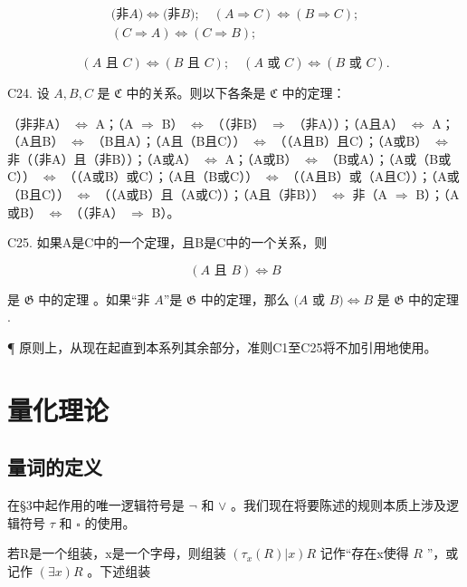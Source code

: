 \[
\begin{array}{c} \text {(非} A) \iff \text {(非} B); \quad (A \Rightarrow C) \iff (B \Rightarrow C); \\ (C \Rightarrow A) \iff (C \Rightarrow B); \end{array}
\]

\[
(A \text {   且   } C) \Longleftrightarrow (B \text {   且   } C); \quad (A \text {   或   } C) \Longleftrightarrow (B \text {   或   } C).
\]

C24. 设 \(A, B, C\) 是 \(\mathfrak{C}\) 中的关系。则以下各条是 \(\mathfrak{C}\) 中的定理：

（非非A） \(\Longleftrightarrow\) A；（A \(\Longrightarrow\) B） \(\Longleftrightarrow\) （（非B） \(\Longrightarrow\) （非A））；（A且A） \(\Longleftrightarrow\) A；（A且B） \(\Longleftrightarrow\) （B且A）；（A且（B且C）） \(\Longleftrightarrow\) （（A且B）且C）；（A或B） \(\Longleftrightarrow\) 非（（非A）且（非B））；（A或A） \(\Longleftrightarrow\) A；（A或B） \(\Longleftrightarrow\) （B或A）；（A或（B或C）） \(\Longleftrightarrow\) （（A或B）或C）；（A且（B或C）） \(\Longleftrightarrow\) （（A且B）或（A且C））；（A或（B且C）） \(\Longleftrightarrow\) （（A或B）且（A或C））；（A且（非B）） \(\Longleftrightarrow\) 非（A \(\Longrightarrow\) B）；（A或B） \(\Longleftrightarrow\) （（非A） \(\Longrightarrow\) B）。

C25. 如果A是C中的一个定理，且B是C中的一个关系，则

\[
(A \text {   且   } B) \Longleftrightarrow B
\]

是 \(\mathfrak{G}\) 中的定理 。如果``非 \(A\)''是 \(\mathfrak{G}\) 中的定理，那么 \((A\) 或 \(B) \Longleftrightarrow B\) 是 \(\mathfrak{G}\) 中的定理 .

¶ 原则上，从现在起直到本系列其余部分，准则C1至C25将不加引用地使用。

\section{量化理论}

\subsection{量词的定义}

在§3中起作用的唯一逻辑符号是 \(\neg\) 和 \(\vee\) 。我们现在将要陈述的规则本质上涉及逻辑符号 \(\tau\) 和 \(\square\) 的使用。

若R是一个组装，x是一个字母，则组装 \((\tau_{x}(R)|x)R\) 记作“存在x使得 \(R\) ”，或记作 \((\exists x)R\) 。下述组装

